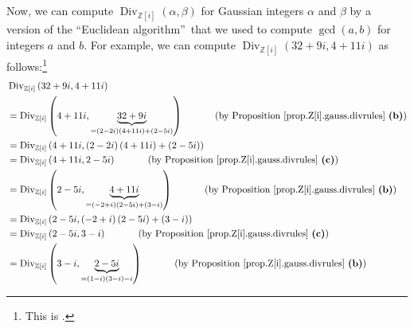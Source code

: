 \documentclass[numbers=enddot,12pt,final,onecolumn,notitlepage]{scrartcl}%
\numberwithin{exer}{subsection}
\theoremstyle{definition}
\begin{document}
Now, we can compute $\operatorname*{Div}\nolimits_{\mathbb{Z}\left[  i\right]
}\left(  \alpha,\beta\right)  $ for Gaussian integers $\alpha$ and $\beta$ by
a version of the \textquotedblleft Euclidean algorithm\textquotedblright\ that
we used to compute $\gcd\left(  a,b\right)  $ for integers $a$ and $b$. For
example, we can compute $\operatorname*{Div}\nolimits_{\mathbb{Z}\left[
i\right]  }\left(  32+9i,4+11i\right)  $ as follows:\footnote{This is
\cite[Example 4.4]{Conrad-Gauss}.}%
\begin{align*}
&  \operatorname*{Div}\nolimits_{\mathbb{Z}\left[  i\right]  }\left(
32+9i,4+11i\right) \\
&  =\operatorname*{Div}\nolimits_{\mathbb{Z}\left[  i\right]  }\left(
4+11i,\underbrace{32+9i}_{=\left(  2-2i\right)  \left(  4+11i\right)  +\left(
2-5i\right)  }\right)  \ \ \ \ \ \ \ \ \ \ \left(  \text{by Proposition
\ref{prop.Z[i].gauss.divrules} \textbf{(b)}}\right) \\
&  =\operatorname*{Div}\nolimits_{\mathbb{Z}\left[  i\right]  }\left(
4+11i,\left(  2-2i\right)  \left(  4+11i\right)  +\left(  2-5i\right)  \right)
\\
&  =\operatorname*{Div}\nolimits_{\mathbb{Z}\left[  i\right]  }\left(
4+11i,2-5i\right)  \ \ \ \ \ \ \ \ \ \ \left(  \text{by Proposition
\ref{prop.Z[i].gauss.divrules} \textbf{(c)}}\right) \\
&  =\operatorname*{Div}\nolimits_{\mathbb{Z}\left[  i\right]  }\left(
2-5i,\underbrace{4+11i}_{=\left(  -2+i\right)  \left(  2-5i\right)  +\left(
3-i\right)  }\right)  \ \ \ \ \ \ \ \ \ \ \left(  \text{by Proposition
\ref{prop.Z[i].gauss.divrules} \textbf{(b)}}\right) \\
&  =\operatorname*{Div}\nolimits_{\mathbb{Z}\left[  i\right]  }\left(
2-5i,\left(  -2+i\right)  \left(  2-5i\right)  +\left(  3-i\right)  \right) \\
&  =\operatorname*{Div}\nolimits_{\mathbb{Z}\left[  i\right]  }\left(
2-5i,3-i\right)  \ \ \ \ \ \ \ \ \ \ \left(  \text{by Proposition
\ref{prop.Z[i].gauss.divrules} \textbf{(c)}}\right) \\
&  =\operatorname*{Div}\nolimits_{\mathbb{Z}\left[  i\right]  }\left(
3-i,\underbrace{2-5i}_{=\left(  1-i\right)  \left(  3-i\right)  -i}\right)
\ \ \ \ \ \ \ \ \ \ \left(  \text{by Proposition
\ref{prop.Z[i].gauss.divrules} \textbf{(b)}}\right)
\end{align*}%
\end{document}
